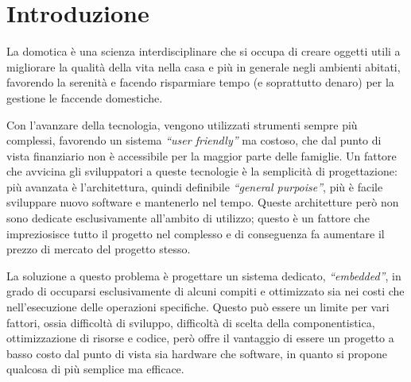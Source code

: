 \documentclass[a4paper,titlepage]{book}
\begin{document}
\begin{frontespizio}
\end{frontespizio}





\chapter*{Introduzione}
La domotica è una scienza interdisciplinare che si occupa di creare oggetti utili a migliorare la qualità della vita nella casa e più in generale negli ambienti abitati, favorendo la serenità e facendo risparmiare tempo (e soprattutto denaro) per la gestione le faccende domestiche.
 
Con l'avanzare della tecnologia, vengono utilizzati strumenti sempre più complessi, favorendo un sistema \textit{``user friendly''} ma costoso, che dal punto di vista finanziario non è accessibile per la maggior parte delle famiglie. Un fattore che avvicina gli sviluppatori a queste tecnologie è la semplicità di progettazione: più avanzata è l'architettura, quindi definibile \textit{``general purpoise''}, più è facile sviluppare nuovo software e mantenerlo nel tempo. Queste architetture però non sono dedicate esclusivamente all'ambito di utilizzo; questo è un fattore che impreziosisce tutto il progetto nel complesso e di conseguenza fa aumentare il prezzo di mercato del progetto stesso.

La soluzione a questo problema è progettare un sistema dedicato, \textit{``embedded''}, in grado di occuparsi esclusivamente di alcuni compiti e ottimizzato sia nei costi che nell'esecuzione delle operazioni specifiche. Questo può essere un limite per vari fattori, ossia difficoltà di sviluppo, difficoltà di scelta della componentistica, ottimizzazione di risorse e codice, però offre il vantaggio di essere un progetto a basso costo dal punto di vista sia hardware che software, in quanto si propone qualcosa di più semplice ma efficace.
\end{document}
